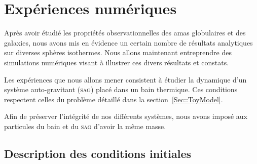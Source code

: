 \chapter{Expériences numériques}
	\minitoc


Après avoir étudié les propriétés observationnelles des amas globulaires et des galaxies, nous avons mis en évidence un certain nombre
de résultats analytiques sur diverses sphères isothermes. Nous allons maintenant entreprendre des simulations numériques visant
à illustrer ces divers résultats et constats.

Les expériences que nous allons mener consistent à étudier la dynamique d'un système auto-gravitant (\textsc{sag}) placé
dans un bain thermique. Ces conditions respectent celles du problème détaillé dans la section~\ref{Sec::ToyModel}.


Afin de préserver l'intégrité de nos différents systèmes, nous avons imposé aux particules du bain et du \textsc{sag} d'avoir la
même masse.

\section{Description des conditions initiales}


